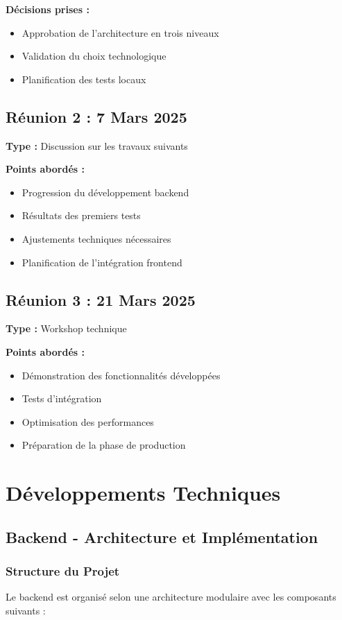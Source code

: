 \documentclass[12pt,a4paper]{article}
\begin{document}
\textbf{Décisions prises :}
\begin{itemize}
    \item Approbation de l'architecture en trois niveaux
    \item Validation du choix technologique
    \item Planification des tests locaux
\end{itemize}

\subsection{Réunion 2 : 7 Mars 2025}
\textbf{Type :} Discussion sur les travaux suivants

\textbf{Points abordés :}
\begin{itemize}
    \item Progression du développement backend
    \item Résultats des premiers tests
    \item Ajustements techniques nécessaires
    \item Planification de l'intégration frontend
\end{itemize}

\subsection{Réunion 3 : 21 Mars 2025}
\textbf{Type :} Workshop technique

\textbf{Points abordés :}
\begin{itemize}
    \item Démonstration des fonctionnalités développées
    \item Tests d'intégration
    \item Optimisation des performances
    \item Préparation de la phase de production
\end{itemize}

\section{Développements Techniques}

\subsection{Backend - Architecture et Implémentation}

\subsubsection{Structure du Projet}
Le backend est organisé selon une architecture modulaire avec les composants suivants :
\end{document}
